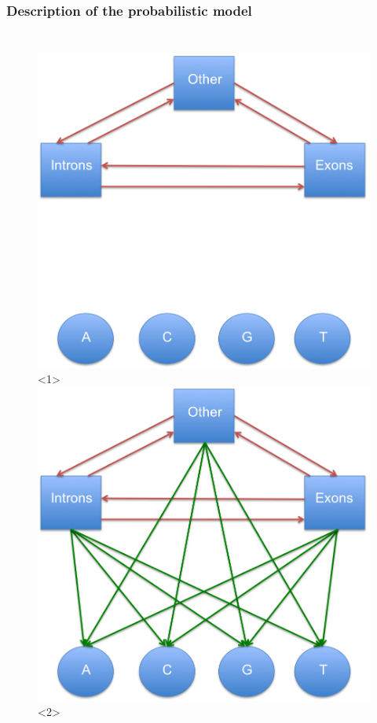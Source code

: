 \documentclass{beamer}[12pt]
\begin{document}
\begin{frame}
\frametitle{Description of the probabilistic model}
\begin{columns}

		\begin{figure}[h]
			\centering
			\includegraphics[width=1.0\textwidth]{../picturesforthepresentation/HMM1.png}<1>
			\includegraphics[width=1.0\textwidth]{../picturesforthepresentation/HMM2.png}<2>		
		\end{figure}
		

\end{columns}
\end{frame}
\end{document}

